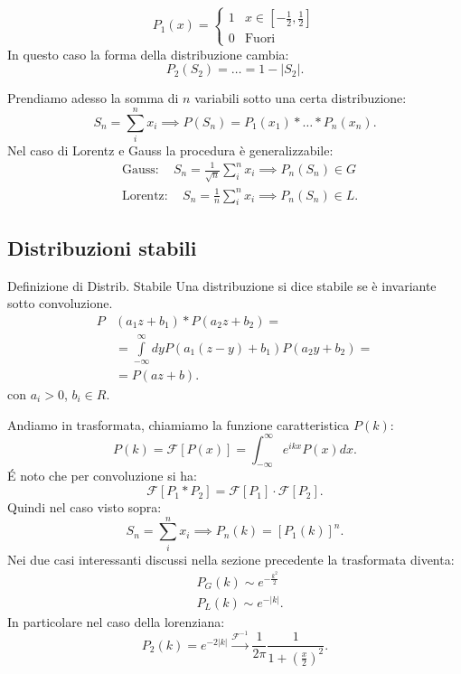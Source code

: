 \noindent
\begin{exmp}
\[
    P_1(x) = 
    \begin{cases}
	1 & x \in \left[-\frac{1}{2}, \frac{1}{2}\right]\\
	0 & \text{Fuori}
    \end{cases}
\] 
In questo caso la forma della distribuzione cambia:
\[
    P_2(S_2) = \ldots = 1 - \left|S_2\right| 
.\] 
\end{exmp}
\noindent
Prendiamo adesso la somma di $n$ variabili sotto una certa distribuzione:
\[
    S_n = \sum_{i}^{n} x_i \implies  P(S_n) = P_1(x_1) * \ldots * P_n(x_n) 
.\] 
Nel caso di Lorentz e Gauss la procedura è generalizzabile:
\[\begin{aligned}
    &\text{Gauss}: \quad S_n = \frac{1}{\sqrt{n}} \sum_{i}^{n} x_i \implies  P_n(S_n) \in G\\
    &\text{Lorentz}: \quad S_n = \frac{1}{n} \sum_{i}^{n} x_i \implies  P_n(S_n) \in L
.\end{aligned}\]
\subsection{Distribuzioni stabili}%
\label{sub:Distribuzioni stabili}
\begin{bluebox}{Definizione di Distrib. Stabile}
    Una distribuzione si dice stabile se è invariante sotto convoluzione.
    \[\begin{aligned}
	P&(a_1z+b_1)*P(a_2z+b_2) =\\
	&=\int\limits_{-\infty}^{\infty} dy P(a_1(z-y) +b_1) P(a_2y + b_2)  = \\
	& = P(az + b) 
    .\end{aligned}\]
    con $a_i >0$, $b_i \in R$.
\end{bluebox}
\noindent
Andiamo in trasformata, chiamiamo la funzione caratteristica $P(k)$:
\[
    P(k) = \mathcal{F}\left[P(x) \right] = \int_{-\infty}^{\infty} e^{ikx}P(x) dx 
.\] 
\'E noto che per convoluzione si ha:
\[
    \mathcal{F}\left[P_1*P_2\right] = \mathcal{F}\left[P_1\right]\cdot \mathcal{F}\left[P_2\right]
.\] 
Quindi nel caso visto sopra:
\[
    S_n = \sum_{i}^{n} x_i \implies  P_n(k) = \left[P_1(k)\right]^{n}
.\] 
Nei due casi interessanti discussi nella sezione precedente la trasformata diventa:
\[\begin{aligned}
    &P_G(k) \sim e^{-\frac{k^2}{2}}\\
    &P_L(k) \sim e^{-\left|k\right|}
.\end{aligned}\]
In particolare nel caso della lorenziana:
\[
    P_2(k) = e^{-2\left|k\right|} \xrightarrow[]{\mathcal{F}^{-1}} \frac{1}{2\pi}\frac{1}{1+\left(\frac{x}{2}\right)^2}
.\] 
